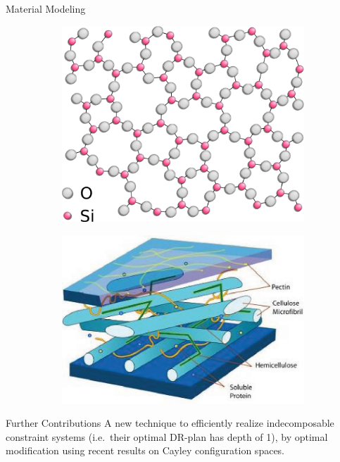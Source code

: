 \documentclass{beamer}
\begin{document}
\begin{frame}{Material Modeling}
\begin{figure}
\begin{subfigure}{.24\linewidth}
        \end{subfigure}
        \hfill
        \begin{subfigure}{.24\linewidth}\centering
            \includegraphics[width=\linewidth]{../../img/Silica}
        \end{subfigure}
        \hfill
        \begin{subfigure}{.24\linewidth}\centering
            \includegraphics[width=\linewidth]{../../img/crosslink}
        \end{subfigure}
    \end{figure}
\end{frame}

\begin{frame}{Further Contributions}
    A new technique to efficiently realize indecomposable constraint systems (i.e.\ their optimal DR-plan has depth of 1), by optimal modification using recent results on Cayley configuration spaces.
\end{frame}
\end{document}
